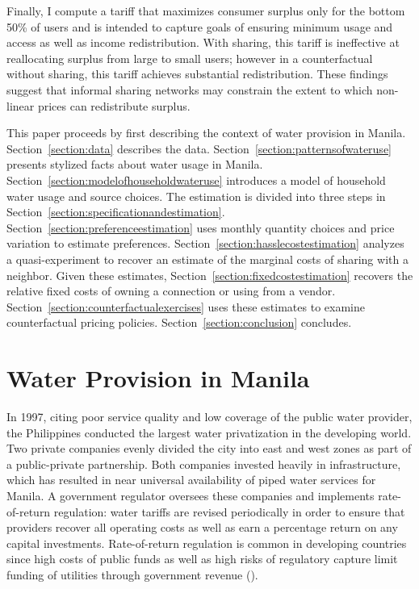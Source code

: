 \documentclass[12pt]{article}
\begin{document}
Finally, I compute a tariff that maximizes consumer surplus only for the bottom 50\% of users and is intended to capture goals of ensuring minimum usage and access as well as income redistribution.  With sharing, this tariff is ineffective at reallocating surplus from large to small users; however in a counterfactual without sharing, this tariff achieves substantial redistribution.  These findings suggest that informal sharing networks may constrain the extent to which non-linear prices can redistribute surplus.

This paper proceeds by first describing the context of water provision in Manila.  Section~\ref{section:data} describes the data.  Section~\ref{section:patternsofwateruse} presents stylized facts about water usage in Manila.  Section~\ref{section:modelofhouseholdwateruse} introduces a model of household water usage and source choices.  The estimation is divided into three steps in Section~\ref{section:specificationandestimation}.  Section~\ref{section:preferenceestimation} uses monthly quantity choices and price variation to estimate preferences.  Section~\ref{section:hasslecostestimation} analyzes a quasi-experiment to recover an estimate of the marginal costs of sharing with a neighbor.  Given these estimates, Section~\ref{section:fixedcostestimation} recovers the relative fixed costs of owning a connection or using from a vendor.  Section~\ref{section:counterfactualexercises} uses these estimates to examine counterfactual pricing policies.  Section~\ref{section:conclusion} concludes.



\section{Water Provision in Manila}

In 1997, citing poor service quality and low coverage of the public water provider, the Philippines conducted the largest water privatization in the developing world.  Two private companies evenly divided the city into east and west zones as part of a public-private partnership.  Both companies invested heavily in infrastructure, which has resulted in near universal availability of piped water services for Manila.  A government regulator oversees these companies and implements rate-of-return regulation: water tariffs are revised periodically in order to ensure that providers recover all operating costs as well as earn a percentage return on any capital investments.  Rate-of-return regulation is common in developing countries since high costs of public funds as well as high risks of regulatory capture limit funding of utilities through government revenue (\cite{laffont2005regulation}).
\end{document}
